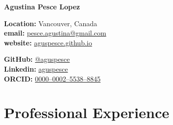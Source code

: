 \documentclass[10pt, a4paper]{article}
\makeatletter
\newcommand{\firstname}{Agustina}
\newcommand{\familyname}{Pesce Lopez}
\newcommand{\email}{pesce.agustina@gmail.com}
\newcommand{\website}{aguspesce.github.io}
\newcommand{\github}{aguspesce}
\newcommand{\linkedin}{aguspesce}
\newcommand{\orcid}{0000--0002--5538--8845}
\newcommand{\fullname}{\firstname{} \familyname}
\newcommand{\maintitle}[1]{
    \begin{center}
        \textbf{\Huge #1}
    \end{center}
}
\newcommand{\subtitle}[1]{
    \begin{center}
        {\large #1}
    \end{center}
}
\newcommand{\affiliation}[1]{
    \begin{center}
        {#1}
    \end{center}
}
\newcommand{\entriespad}{0.75em}
\newcommand{\MAIL}[1]{\href{mailto:#1}{#1}}
\newcommand{\GITHUB}[1]{\href{https://github.com/#1}{@#1}}
\newcommand{\ORCID}[1]{\href{https://orcid.org/#1}{#1}}
\newcommand{\WEBSITE}[1]{\href{https://#1}{#1}}
\newcommand{\LINKEDIN}[1]{\href{https://linkedin.com/in/#1}{#1}}
\makeatother
\begin{document}
\maintitle{\fullname}
\vspace{\entriespad}

\begin{minipage}[t]{0.60\linewidth}
    \begin{flushleft}
        \textbf{Location:} Vancouver, Canada
        \\
        \textbf{email:} \MAIL{\email}
        \\
        \textbf{website:} \WEBSITE{\website}
    \end{flushleft}
\end{minipage}
\hfill
\begin{minipage}[t]{0.40\linewidth}
    \begin{flushright}
        \textbf{GitHub:} \GITHUB{\github}
        \\
        \textbf{Linkedin:} \LINKEDIN{\linkedin}
        \\
        \textbf{ORCID:} \ORCID{\orcid}
    \end{flushright}
\end{minipage}

\vspace{\entriespad}

\vspace{\entriespad}

\section{Professional Experience}
\end{document}
